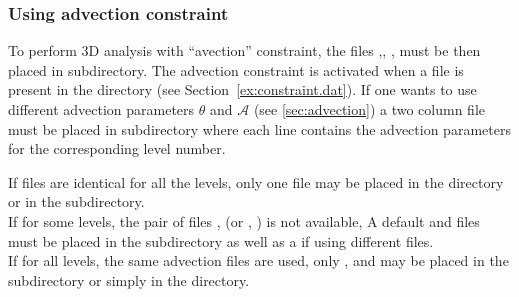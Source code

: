 \begin{center}
\end{center}


\subsubsection{Using advection constraint}
\label{advconstuse}


To perform 3D analysis with  ``avection''  constraint, the files ,\linebreak {}, ,  must be then placed in  subdirectory. The advection constraint is activated when a  file is present in the  directory (see Section~\ref{ex:constraint.dat}). If one wants to use different advection parameters $\theta$ and $\mathcal{A}$ (see \ref{sec:advection}) a two column  file must be placed in  subdirectory where each line contains the advection parameters for the corresponding level number.

If  files are identical for all the levels, only one file  may be placed in the  directory or in the  subdirectory.\\
 If for some levels, the pair of files ,  (or , ) is not available, A default  and  files must be placed in the  subdirectory as well as a  if using different  files.\\
 If for all levels, the same advection files are used, only  ,  and  may be placed in the  subdirectory or simply in the  directory.


\begin{center}
\end{center}


